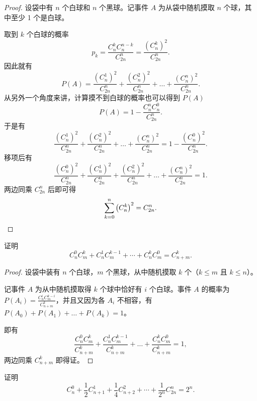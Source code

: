 \begin{proof}
设袋中有 \(n\) 个白球和 \(n\) 个黑球。记事件 \(A\) 为从袋中随机摸取 \(n\) 个球，其中至少 1 个是白球。

取到 \(k\) 个白球的概率
\[
p_k = \frac{C_{n}^{k} C_{n}^{n - k}}{C_{2n}^{n}} = \frac{\left( C_{n}^{k} \right)^2}{C_{2n}^{n}}. 
\]
因此就有
\[
P(A) = \frac{\left( C_{n}^{1} \right)^2}{C_{2n}^{n}} + \frac{\left( C_{n}^{2} \right)^2}{C_{2n}^{n}} + \ldots + \frac{\left( C_{n}^{n} \right)^2}{C_{2n}^{n}}. 
\]
从另外一个角度来讲，计算摸不到白球的概率也可以得到 \(P(A)\)
\[
P(A) = 1 - \frac{C_{n}^{n} C_{n}^{0}}{C_{2n}^{n}}. 
\]
于是有
\[
\frac{\left( C_{n}^{1} \right)^2}{C_{2n}^{n}} + \frac{\left( C_{n}^{2} \right)^2}{C_{2n}^{n}} + \ldots + \frac{\left( C_{n}^{n} \right)^2}{C_{2n}^{n}} = 1 - \frac{\left( C_{n}^{0} \right)^2}{C_{2n}^{n}}. 
\]
移项后有
\[
\frac{\left( C_{n}^{0} \right)^2}{C_{2n}^{n}} + \frac{\left( C_{n}^{1} \right)^2}{C_{2n}^{n}} + \frac{\left( C_{n}^{2} \right)^2}{C_{2n}^{n}} + \ldots + \frac{\left( C_{n}^{n} \right)^2}{C_{2n}^{n}} = 1. 
\]
两边同乘 \(C_{2n}^{n}\) 后即可得
\[
\sum_{k = 0}^{n} \left( C_{n}^{k} \right)^2 = C_{2n}^{n}. \qedhere
\]
\end{proof}

\begin{example}
  证明 \[C_n^0 C_m^k + C_n^1 C_m^{k-1} + \cdots + C_n^k C_m^0 = C_{n+m}^k. \]
\end{example}

\begin{proof}
设袋中装有 \(n\) 个白球，\(m\) 个黑球，从中随机摸取 \(k\) 个（\(k \leq m\) 且 \(k \leq n\)）。

记事件 \(A\) 为从中随机摸取得 \(k\) 个球中恰好有 \(i\) 个白球。事件 \(A\) 的概率为 \(P(A_i) = \frac{C_{n}^{i} C_{m}^{k - i}}{C_{n + m}^{k}}\)，并且又因为各 \(A_i\) 不相容，有 \(P(A_0) + P(A_1) + \ldots + P(A_k) = 1\)。

即有
\[
\frac{C_{n}^{0} C_{m}^{k}}{C_{n + m}^{k}} + \frac{C_{n}^{1} C_{m}^{k - 1}}{C_{n + m}^{k}} + \ldots + \frac{C_{n}^{k} C_{m}^{0}}{C_{n + m}^{k}} = 1,
\]
两边同乘 $C_{n + m}^{k}$ 即得证。
\end{proof}

\begin{example}
  证明 \[C_n^0 + \frac{1}{2} C_{n+1}^1 + \frac{1}{4} C_{n+2}^2 + \cdots + \frac{1}{2^n} C_{2n}^n = 2^n. \]
\end{example}

